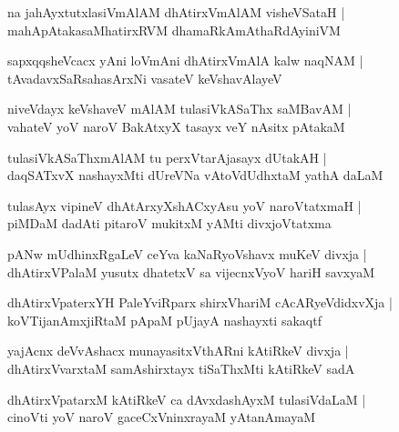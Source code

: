 \begin{shloka}
na ja{hA}yxtutxlasiVmAlAM dhAtirxVmAlAM visheVSataH |\\
mahApAtakasaMhatirxRVM dhamaRkAmAthaRdAyiniVM
\end{shloka}

\begin{shloka}
sapxqqsheVcacx yAni loVmAni dhAtirxVmAlA kalw naqNAM |\\
tAvadavxSaRsahasArxNi vasateV keVshavAlayeV 
\end{shloka}

\begin{shloka}
niveVdayx keVshaveV mAlAM tulasiVkASaThx saMBavAM |\\
vahateV yoV naroV BakAtxyX tasayx veY nAsitx pAtakaM
\end{shloka}

\begin{shloka}
tulasiVkASaThxmAlAM tu perxVtarAjasayx dUtakAH |\\
daqSATxvX nashayxMti dUreVNa vAtoVdUdhxtaM yathA daLaM 
\end{shloka}

\begin{shloka}
tulasAyx vipineV dhAtArxyXshACxyAsu yoV naroVtatxmaH |\\
piMDaM dadAti pitaroV mukitxM yAMti divxjoVtatxma
\end{shloka}

\begin{shloka}
pANw mUdhinxRgaLeV ceYva kaNaRyoVshavx muKeV divxja |\\
dhAtirxVPalaM yusutx dhatetxV sa vijecnxVyoV hariH savxyaM 
\end{shloka}

\begin{shloka}
dhAtirxVpaterxYH PaleYviRparx shirxVhariM cAcARyeVdidxvXja |\\
koVTijanAmxjiRtaM pApaM pUjayA nashayxti sakaqtf
\end{shloka}

\begin{shloka}
yajAcnx deVvAshacx munayasitxVthARni kAtiRkeV divxja |\\
dhAtirxVvarxtaM samAshirxtayx tiSaThxMti kAtiRkeV sadA 
\end{shloka}

\begin{shloka}
dhAtirxVpatarxM kAtiRkeV ca dAvxdashAyxM tulasiVdaLaM |\\
cinoVti yoV naroV gaceCxVninxrayaM yAtanAmayaM 
\end{shloka}

